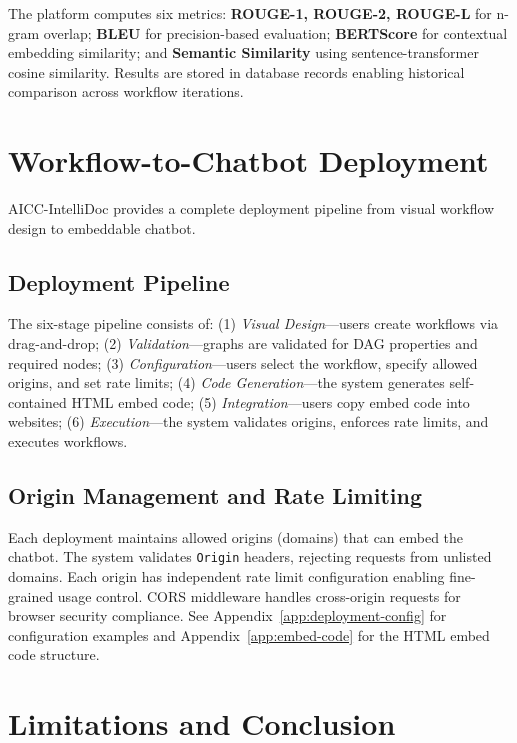 \documentclass[11pt]{article}
\begin{document}
The platform computes six metrics: \textbf{ROUGE-1, ROUGE-2, ROUGE-L} for n-gram overlap; \textbf{BLEU} for precision-based evaluation; \textbf{BERTScore} for contextual embedding similarity; and \textbf{Semantic Similarity} using sentence-transformer cosine similarity. Results are stored in database records enabling historical comparison across workflow iterations.


\section{Workflow-to-Chatbot Deployment}
\label{sec:deployment}

AICC-IntelliDoc provides a complete deployment pipeline from visual workflow design to embeddable chatbot.

\subsection{Deployment Pipeline}

The six-stage pipeline consists of: (1) \textit{Visual Design}—users create workflows via drag-and-drop; (2) \textit{Validation}—graphs are validated for DAG properties and required nodes; (3) \textit{Configuration}—users select the workflow, specify allowed origins, and set rate limits; (4) \textit{Code Generation}—the system generates self-contained HTML embed code; (5) \textit{Integration}—users copy embed code into websites; (6) \textit{Execution}—the system validates origins, enforces rate limits, and executes workflows.

\subsection{Origin Management and Rate Limiting}

Each deployment maintains allowed origins (domains) that can embed the chatbot. The system validates \texttt{Origin} headers, rejecting requests from unlisted domains. Each origin has independent rate limit configuration enabling fine-grained usage control. CORS middleware handles cross-origin requests for browser security compliance. See Appendix~\ref{app:deployment-config} for configuration examples and Appendix~\ref{app:embed-code} for the HTML embed code structure.


\section{Limitations and Conclusion}
\label{sec:conclusion}
\end{document}
